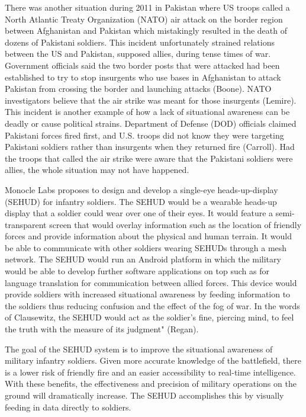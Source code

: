 There was another situation during 2011 in Pakistan where US troops called
a North Atlantic Treaty Organization (NATO) air attack on the border region
between Afghanistan and Pakistan which mistakingly resulted in the death of
dozens of Pakistani soldiers. This incident unfortunately strained
relations between the US and Pakistan, supposed allies, during tense times
of war. Government officials said the two border posts that were attacked
had been established to try to stop insurgents who use bases in Afghanistan
to attack Pakistan from crossing the border and launching attacks (Boone).
NATO investigators believe that the air strike was meant for those
insurgents (Lemire). This incident is another example of how a lack of
situational awareness can be deadly or cause political strains. Department
of Defense (DOD) officials claimed Pakistani forces fired first, and U.S.
troops did not know they were targeting Pakistani soldiers rather than
insurgents when they returned fire (Carroll). Had the troops that called
the air strike were aware that the Pakistani soldiers were allies, the
whole situation may not have happened.


Monocle Labs proposes to design and develop a single-eye heads-up-display
(SEHUD) for infantry soldiers. The SEHUD would be a wearable heads-up
display that a soldier could wear over one of their eyes. It would feature
a semi-transparent screen that would overlay information such as the
location of friendly forces and provide information about the physical and
human terrain. It would be able to communicate with other soldiers wearing
SEHUDs through a mesh network. The SEHUD would run an Android platform in
which the military would be able to develop further software applications
on top such as for language translation for communication between allied
forces. This device would provide soldiers with increased situational
awareness by feeding information to the soldiers thus reducing confusion
and the effect of the fog of war. In the words of Clausewitz, the SEHUD
would act as the soldier's fine, piercing mind, to feel the truth with the
measure of its judgment" (Regan).




The goal of the SEHUD system is to improve the situational awareness of
military infantry soldiers. Given more accurate knowledge of the battlefield,
there is a lower risk of friendly fire and an easier accessibility to real-time
intelligence. With these benefits, the effectiveness and precision of military
operations on the ground will dramatically increase. The SEHUD accomplishes
this by visually feeding in data directly to soldiers.


